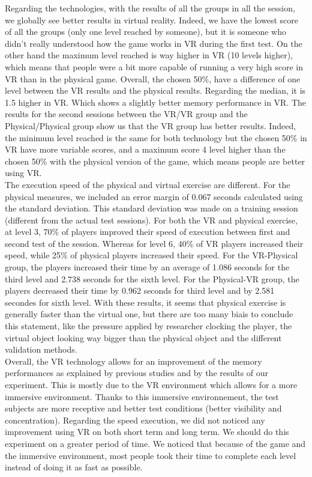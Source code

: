 \documentclass[12pt, openany, twocolumn]{article}
\begin{document}
    Regarding the technologies, with the results of all the groups in all the session, we globally see better results in virtual reality. Indeed, we have the lowest score of all the groups (only one level reached by someone), but it is someone who didn't really understood how the game works in VR during the first test. On the other hand the maximum level reached is way higher in VR (10 levels higher), which means that people were a bit more capable of running a very high score in VR than in the physical game.
    Overall, the chosen 50\%, have a difference of one level between the VR results and the physical results. Regarding the median, it is 1.5 higher in VR. Which shows a slightly better memory performance in VR. 
    The results for the second sessions between the VR/VR group and the Physical/Physical group show us that the VR group has better results. Indeed, the minimum level reached is the same for both technology but the chosen 50\% in VR have more variable scores, and a maximum score 4 level higher than the chosen 50\% with the physical version of the game, which means people are better using VR. 
    \\
    
    The execution speed of the physical and virtual exercise are different. For the physical measures, we included an error margin of 0.067 seconds calculated using the standard deviation. This standard deviation was made on a training session (different from the actual test sessions).
    For both the VR and physical exercise, at level 3, 70\% of players improved their speed of execution between first and second test of the session. Whereas for level 6, 40\% of VR players increased their speed, while 25\% of physical players increased their speed.
    For the VR-Physical group, the players increased their time by an average of 1.086 seconds for the third level and 2.738 seconds for the sixth level.
    For the Physical-VR group, the players decreased their time by 0.962 seconds for third level and by 2.581 secondes for sixth level.
    With these results, it seems that physical exercise is generally faster than the virtual one, but there are too many biais to conclude this statement, like the pressure applied by researcher clocking the player, the virtual object looking way bigger than the physical object and the different validation methods.
    \\

    Overall, the VR technology allows for an improvement of the memory performances as explained by previous studies and by the results of our experiment.
    This is mostly due to the VR environment which allows for a more immersive environment. Thanks to this immersive environnement, the test subjects are more receptive and better test conditions (better visibility and concentration).
    Regarding the speed execution, we did not noticed any improvement using VR on both short term and long term. We should do this experiment on a greater period of time.
    We noticed that because of the game and the immersive environment, most people took their time to complete each level instead of doing it as fast as possible.
    \\
\end{document}
